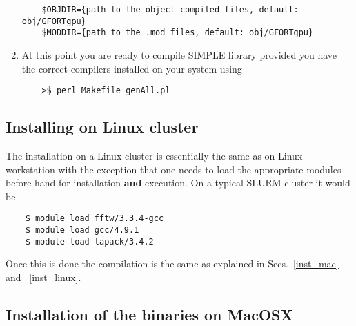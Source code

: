 \documentclass[review]{elsarticle}
\begin{document}
\begin{enumerate}
\begin{verbatim}
    $OBJDIR={path to the object compiled files, default: obj/GFORTgpu}
    $MODDIR={path to the .mod files, default: obj/GFORTgpu}
\end{verbatim}
  
\item \label{perlMake}At this point you are ready to compile SIMPLE
  library provided you have the correct compilers installed on your
  system using   
\begin{verbatim}
    >$ perl Makefile_genAll.pl
\end{verbatim}

\end{enumerate}

\subsection{Installing on Linux cluster}
\label{inst_clusters_linux}

The installation on a Linux cluster is essentially the same as on Linux
workstation with the exception that one needs to load the
appropriate modules before hand for installation {\bf{and}}
execution. On a typical SLURM cluster it would be

\begin{verbatim}
    $ module load fftw/3.3.4-gcc
    $ module load gcc/4.9.1
    $ module load lapack/3.4.2 
\end{verbatim}

Once this is done the compilation is the same as explained in
Secs.~\ref{inst_mac} and ~\ref{inst_linux}.



\subsection{Installation of the binaries on MacOSX}
\label{inst_binaries_macosx}
\end{document}
